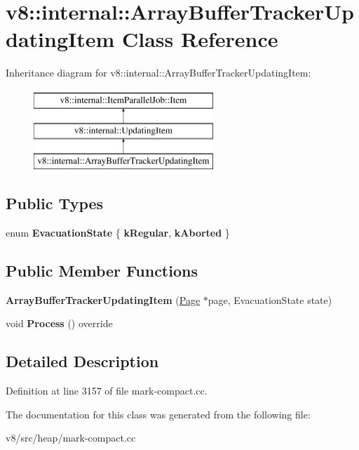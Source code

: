 \hypertarget{classv8_1_1internal_1_1ArrayBufferTrackerUpdatingItem}{}\section{v8\+:\+:internal\+:\+:Array\+Buffer\+Tracker\+Updating\+Item Class Reference}
\label{classv8_1_1internal_1_1ArrayBufferTrackerUpdatingItem}
Inheritance diagram for v8\+:\+:internal\+:\+:Array\+Buffer\+Tracker\+Updating\+Item\+:\begin{figure}[H]
\begin{center}
\leavevmode
\includegraphics[height=3.000000cm]{classv8_1_1internal_1_1ArrayBufferTrackerUpdatingItem}
\end{center}
\end{figure}
\subsection*{Public Types}
\begin{DoxyCompactItemize}
\item 
\mbox{\label{classv8_1_1internal_1_1ArrayBufferTrackerUpdatingItem_ab44224804a62691a7a86dca5ef252068}} 
enum {\bfseries Evacuation\+State} \{ {\bfseries k\+Regular}, 
{\bfseries k\+Aborted}
 \}
\end{DoxyCompactItemize}
\subsection*{Public Member Functions}
\begin{DoxyCompactItemize}
\item 
\mbox{\label{classv8_1_1internal_1_1ArrayBufferTrackerUpdatingItem_a63ffc0c9d9aedaa5f215507e4e12466d}} 
{\bfseries Array\+Buffer\+Tracker\+Updating\+Item} (\mbox{\hyperlink{classv8_1_1internal_1_1Page}{Page}} $\ast$page, Evacuation\+State state)
\item 
\mbox{\label{classv8_1_1internal_1_1ArrayBufferTrackerUpdatingItem_a310497aae8bcd00e9e7527e4f47d1498}} 
void {\bfseries Process} () override
\end{DoxyCompactItemize}


\subsection{Detailed Description}


Definition at line 3157 of file mark-\/compact.\+cc.



The documentation for this class was generated from the following file\+:\begin{DoxyCompactItemize}
\item 
v8/src/heap/mark-\/compact.\+cc\end{DoxyCompactItemize}
